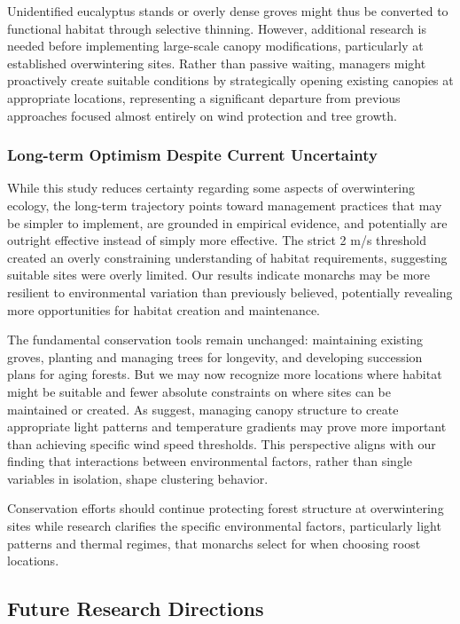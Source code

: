 Unidentified eucalyptus stands or overly dense groves might thus be converted to functional habitat through selective thinning. However, additional research is needed before implementing large-scale canopy modifications, particularly at established overwintering sites. Rather than passive waiting, managers might proactively create suitable conditions by strategically opening existing canopies at appropriate locations, representing a significant departure from previous approaches focused almost entirely on wind protection and tree growth.

\subsubsection{Long-term Optimism Despite Current Uncertainty}

While this study reduces certainty regarding some aspects of overwintering ecology, the long-term trajectory points toward management practices that may be simpler to implement, are grounded in empirical evidence, and potentially are outright effective instead of simply more effective. The strict 2 m/s threshold created an overly constraining understanding of habitat requirements, suggesting suitable sites were overly limited. Our results indicate monarchs may be more resilient to environmental variation than previously believed, potentially revealing more opportunities for habitat creation and maintenance.

The fundamental conservation tools remain unchanged: maintaining existing groves, planting and managing trees for longevity, and developing succession plans for aging forests. But we may now recognize more locations where habitat might be suitable and fewer absolute constraints on where sites can be maintained or created. As \textcite{sanieeHierarchyScaleInfluence2022} suggest, managing canopy structure to create appropriate light patterns and temperature gradients may prove more important than achieving specific wind speed thresholds. This perspective aligns with our finding that interactions between environmental factors, rather than single variables in isolation, shape clustering behavior.

Conservation efforts should continue protecting forest structure at overwintering sites while research clarifies the specific environmental factors, particularly light patterns and thermal regimes, that monarchs select for when choosing roost locations.

\subsection{Future Research Directions}

